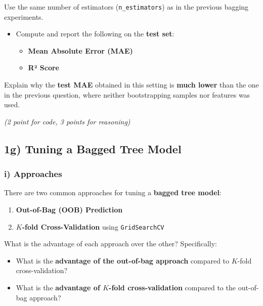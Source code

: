 \documentclass[
  letterpaper,
  DIV=11,
  numbers=noendperiod]{scrreprt}
\providecommand{\tightlist}{%
  \setlength{\itemsep}{0pt}\setlength{\parskip}{0pt}}\usepackage{longtable,booktabs,array}
\begin{document}
Use the same number of estimators (\texttt{n\_estimators}) as in the
previous bagging experiments.

\begin{itemize}
\item
  Compute and report the following on the \textbf{test set}:

  \begin{itemize}
  \tightlist
  \item
    \textbf{Mean Absolute Error (MAE)}
  \item
    \textbf{R² Score}
  \end{itemize}
\end{itemize}

Explain why the \textbf{test MAE} obtained in this setting is
\textbf{much lower} than the one in the previous question, where neither
bootstrapping samples nor features was used.

\emph{(2 point for code, 3 points for reasoning)}

\subsection{1g) Tuning a Bagged Tree
Model}\label{g-tuning-a-bagged-tree-model}

\subsubsection{i) Approaches}\label{i-approaches}

There are two common approaches for tuning a \textbf{bagged tree model}:

\begin{enumerate}
\def\labelenumi{\arabic{enumi}.}
\tightlist
\item
  \textbf{Out-of-Bag (OOB) Prediction}
\item
  \textbf{\(K\)-fold Cross-Validation} using \texttt{GridSearchCV}
\end{enumerate}

What is the advantage of each approach over the other? Specifically:

\begin{itemize}
\tightlist
\item
  What is the \textbf{advantage of the out-of-bag approach} compared to
  \(K\)-fold cross-validation?
\item
  What is the \textbf{advantage of \(K\)-fold cross-validation} compared
  to the out-of-bag approach?
\end{itemize}
\end{document}

